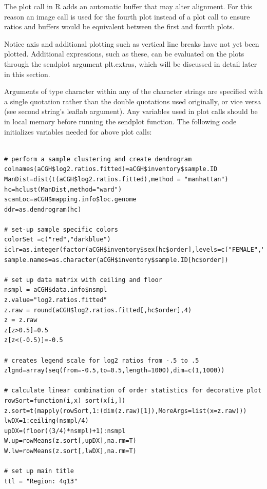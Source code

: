 \documentclass[]{article}
\begin{document}
  The plot call in R adds an automatic buffer that may alter alignment. For this reason  an image call is used for the fourth plot instead of a plot call to ensure ratios and buffers would be equivalent between the first and fourth plots. 

 Notice axis and additional plotting such as vertical line breaks have not yet been plotted. Additional expressions, such as these, can be evaluated on the plots through the sendplot argument plt.extras, which will be discussed in detail later in this section. \newline

\indent Arguments of type character within any of the character strings are specified with a single quotation rather than the double quotations used originally, or vice versa (see second string's leaflab argument). Any variables used in plot calls should be in local memory before running the sendplot function. The following code initializes variables needed for above plot calls:



\begin{verbatim}

# perform a sample clustering and create dendrogram 
colnames(aCGH$log2.ratios.fitted)=aCGH$inventory$sample.ID
ManDist=dist(t(aCGH$log2.ratios.fitted),method = "manhattan")
hc=hclust(ManDist,method="ward")
scanLoc=aCGH$mapping.info$loc.genome
ddr=as.dendrogram(hc)

# set-up sample specific colors
colorSet =c("red","darkblue")
iclr=as.integer(factor(aCGH$inventory$sex[hc$order],levels=c("FEMALE","MALE")))
sample.names=as.character(aCGH$inventory$sample.ID[hc$order])

# set up data matrix with ceiling and floor
nsmpl = aCGH$data.info$nsmpl
z.value="log2.ratios.fitted"
z.raw = round(aCGH$log2.ratios.fitted[,hc$order],4)
z = z.raw
z[z>0.5]=0.5
z[z<(-0.5)]=-0.5

# creates legend scale for log2 ratios from -.5 to .5
zlgnd=array(seq(from=-0.5,to=0.5,length=1000),dim=c(1,1000))

# calculate linear combination of order statistics for decorative plot
rowSort=function(i,x) sort(x[i,])
z.sort=t(mapply(rowSort,1:(dim(z.raw)[1]),MoreArgs=list(x=z.raw)))
lwDX=1:ceiling(nsmpl/4)
upDX=(floor((3/4)*nsmpl)+1):nsmpl
W.up=rowMeans(z.sort[,upDX],na.rm=T)
W.lw=rowMeans(z.sort[,lwDX],na.rm=T)

# set up main title
ttl = "Region: 4q13"

\end{verbatim}
\end{document}

